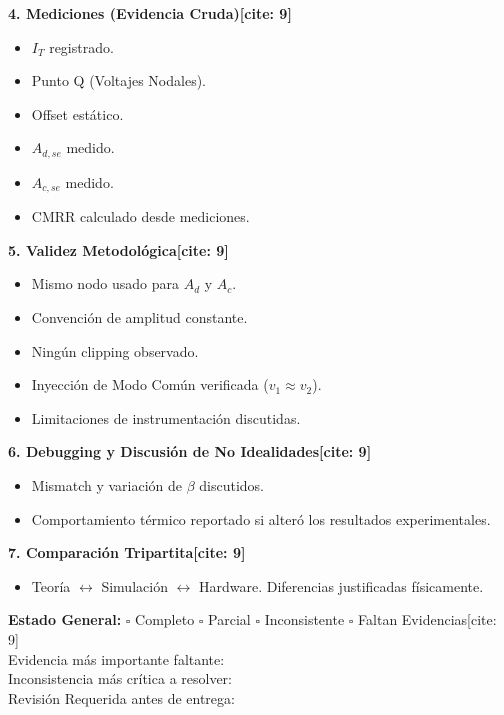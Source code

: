 \documentclass[11pt, a4paper]{article}
\begin{document}
\begin{minipage}[t]{0.48\textwidth}
    \textbf{4. Mediciones (Evidencia Cruda)[cite: 9]}
    \begin{itemize}
        \item[$\square$] $I_T$ registrado.
        \item[$\square$] Punto Q (Voltajes Nodales).
        \item[$\square$] Offset estático.
        \item[$\square$] $A_{d,se}$ medido.
        \item[$\square$] $A_{c,se}$ medido.
        \item[$\square$] CMRR calculado desde mediciones.
    \end{itemize}
    
    \textbf{5. Validez Metodológica[cite: 9]}
    \begin{itemize}
        \item[$\square$] Mismo nodo usado para $A_d$ y $A_c$.
        \item[$\square$] Convención de amplitud constante.
        \item[$\square$] Ningún clipping observado.
        \item[$\square$] Inyección de Modo Común verificada ($v_1 \approx v_2$).
        \item[$\square$] Limitaciones de instrumentación discutidas.
    \end{itemize}
\end{minipage}

\vspace{0.3cm}
\textbf{6. Debugging y Discusión de No Idealidades[cite: 9]}
\begin{itemize}
    \item[$\square$] Mismatch y variación de $\beta$ discutidos.
    \item[$\square$] Comportamiento térmico reportado si alteró los resultados experimentales.
\end{itemize}

\textbf{7. Comparación Tripartita[cite: 9]}
\begin{itemize}
    \item[$\square$] Teoría $\leftrightarrow$ Simulación $\leftrightarrow$ Hardware. Diferencias justificadas físicamente.
\end{itemize}

\vspace{0.4cm}
\begin{tcolorbox}[colback=white, colframe=black, title=\textbf{Veredicto del Reporte}]
    \noindent \textbf{Estado General:} $\square$ Completo \quad $\square$ Parcial \quad $\square$ Inconsistente \quad $\square$ Faltan Evidencias[cite: 9] \\[0.2cm]
    \noindent Evidencia más importante faltante: \hrulefill \\[0.2cm]
    \noindent Inconsistencia más crítica a resolver: \hrulefill \\[0.2cm]
    \noindent Revisión Requerida antes de entrega: \hrulefill
\end{tcolorbox}
\end{document}
